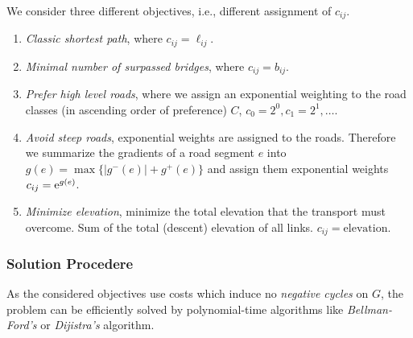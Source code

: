 We consider three different objectives, i.e., different assignment of $c_{ij}$.
\begin{enumerate}
  \item \emph{Classic shortest path}, where $c_{ij}=\ell_{ij}$. \label{obj_short}
  \item \emph{Minimal number of surpassed bridges}, where  $c_{ij}=b_{ij}$.  \label{obj_minBridge}
  \item \emph{Prefer high level roads}, where we assign an exponential weighting to the road classes (in ascending order of preference) $C$, $c_0=2^0,c_1=2^1, \ldots$.  \label{obj_highLevelRoad}
  \item \emph{Avoid steep roads}, exponential weights are assigned to the roads.
  Therefore we summarize the gradients of a road segment $e$ into $g(e)=\max\{{|g^{-}(e)|+g^{+}(e)}\}$
  and assign them exponential weights $c_{ij}=\mathrm{e}^{g(e)}$.
  \label{obj_steep}
  \item \emph{Minimize elevation}, minimize the total elevation that the transport
  must overcome. Sum of the total (descent) elevation of all links. $c_{ij}=\text{elevation}$.
\end{enumerate}

\subsubsection{Solution Procedere}

As the considered objectives use costs which induce no \emph{negative cycles}  on $G$, the problem can be efficiently solved
by polynomial-time algorithms like
\emph{Bellman-Ford's} \cite{Bell1958,Ford1956} or \emph{Dijistra's} \cite{dijkstra1959note} algorithm.


%
%
%
%


